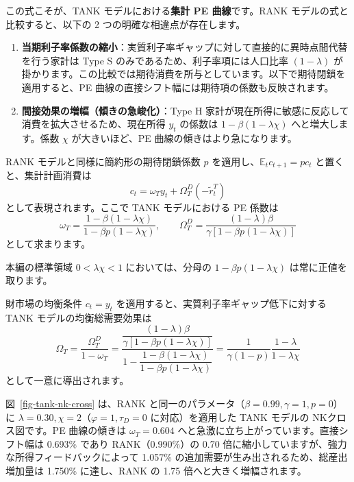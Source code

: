 \documentclass[
  japanese,
  lualatex,
  ja=standard,
  12pt,
  a4paper]{ltjsarticle}
\providecommand{\tightlist}{%
  \setlength{\itemsep}{0pt}\setlength{\parskip}{0pt}}
\begin{document}
この式こそが、TANK モデルにおける\textbf{集計 PE 曲線}です。RANK
モデルの式と比較すると、以下の 2 つの明確な相違点が存在します。

\begin{enumerate}
\def\labelenumi{\arabic{enumi}.}
\tightlist
\item
  \textbf{当期利子率係数の縮小}：実質利子率ギャップに対して直接的に異時点間代替を行う家計は
  Type S のみであるため、利子率項には人口比率 \((1-\lambda)\)
  が掛かります。この比較では期待消費を所与としています。以下で期待閉鎖を適用すると、PE
  曲線の直接シフト幅には期待項の係数も反映されます。
\item
  \textbf{間接効果の増幅（傾きの急峻化）}：Type H
  家計が現在所得に敏感に反応して消費を拡大させるため、現在所得 \(y_t\)
  の係数は \(1 - \beta(1 - \lambda\chi)\) へと増大します。係数 \(\chi\)
  が大きいほど、PE 曲線の傾きはより急になります。
\end{enumerate}

RANK モデルと同様に簡約形の期待閉鎖係数 \(p\)
を適用し、\(\mathbb{E}_t c_{t+1} = p c_t\) と置くと、集計計画消費は \[
c_t = \omega_T y_t + \Omega_T^D(-\widetilde{r}_t^T)
\] として表現されます。ここで TANK モデルにおける PE 係数は \[
\omega_T = \frac{1 - \beta(1 - \lambda\chi)}{1 - \beta p(1 - \lambda\chi)},
\qquad
\Omega_T^D = \frac{(1-\lambda)\beta}{\gamma[1 - \beta p(1 - \lambda\chi)]}
\] として求まります。

本編の標準領域 \(0 < \lambda\chi < 1\) においては、分母の
\(1 - \beta p(1 - \lambda\chi)\) は常に正値を取ります。

財市場の均衡条件 \(c_t = y_t\)
を適用すると、実質利子率ギャップ低下に対する TANK
モデルの均衡総需要効果は \[
\Omega_T
=
\frac{\Omega_T^D}{1 - \omega_T}
=
\frac{\dfrac{(1-\lambda)\beta}{\gamma[1 - \beta p(1 - \lambda\chi)]}}{1 - \dfrac{1 - \beta(1 - \lambda\chi)}{1 - \beta p(1 - \lambda\chi)}}
=
\frac{1}{\gamma(1-p)} \frac{1-\lambda}{1-\lambda\chi}
\] として一意に導出されます。


図~\ref{fig-tank-nk-cross} は、RANK
と同一のパラメータ（\(\beta=0.99, \gamma=1, p=0\)）に
\(\lambda=0.30, \chi=2\)（\(\varphi=1, \tau_D=0\) に対応）を適用した
TANK モデルの NKクロス図です。PE 曲線の傾きは \(\omega_T = 0.604\)
へと急激に立ち上がっています。直接シフト幅は 0.693\% であり
RANK（0.990\%）の 0.70
倍に縮小していますが、強力な所得フィードバックによって 1.057\%
の追加需要が生み出されるため、総産出増加量は 1.750\% に達し、RANK の
1.75 倍へと大きく増幅されます。
\end{document}
